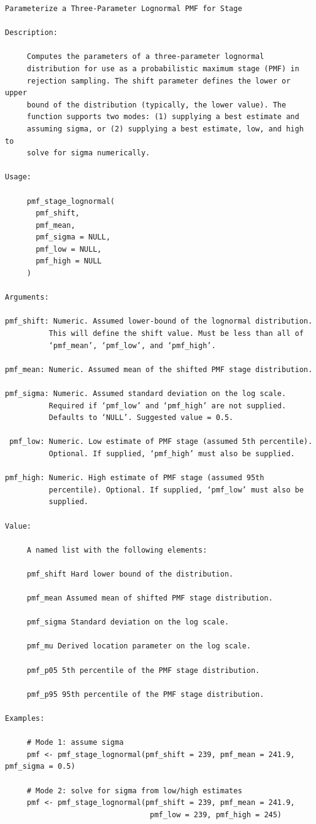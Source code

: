 \documentclass[
  letterpaper,
  DIV=11,
  numbers=noendperiod]{scrreprt}
\begin{document}
\begin{verbatim}
Parameterize a Three-Parameter Lognormal PMF for Stage

Description:

     Computes the parameters of a three-parameter lognormal
     distribution for use as a probabilistic maximum stage (PMF) in
     rejection sampling. The shift parameter defines the lower or upper
     bound of the distribution (typically, the lower value). The
     function supports two modes: (1) supplying a best estimate and
     assuming sigma, or (2) supplying a best estimate, low, and high to
     solve for sigma numerically.

Usage:

     pmf_stage_lognormal(
       pmf_shift,
       pmf_mean,
       pmf_sigma = NULL,
       pmf_low = NULL,
       pmf_high = NULL
     )
     
Arguments:

pmf_shift: Numeric. Assumed lower-bound of the lognormal distribution.
          This will define the shift value. Must be less than all of
          ‘pmf_mean’, ‘pmf_low’, and ‘pmf_high’.

pmf_mean: Numeric. Assumed mean of the shifted PMF stage distribution.

pmf_sigma: Numeric. Assumed standard deviation on the log scale.
          Required if ‘pmf_low’ and ‘pmf_high’ are not supplied.
          Defaults to ‘NULL’. Suggested value = 0.5.

 pmf_low: Numeric. Low estimate of PMF stage (assumed 5th percentile).
          Optional. If supplied, ‘pmf_high’ must also be supplied.

pmf_high: Numeric. High estimate of PMF stage (assumed 95th
          percentile). Optional. If supplied, ‘pmf_low’ must also be
          supplied.

Value:

     A named list with the following elements:

     pmf_shift Hard lower bound of the distribution.

     pmf_mean Assumed mean of shifted PMF stage distribution.

     pmf_sigma Standard deviation on the log scale.

     pmf_mu Derived location parameter on the log scale.

     pmf_p05 5th percentile of the PMF stage distribution.

     pmf_p95 95th percentile of the PMF stage distribution.

Examples:

     # Mode 1: assume sigma
     pmf <- pmf_stage_lognormal(pmf_shift = 239, pmf_mean = 241.9, pmf_sigma = 0.5)
     
     # Mode 2: solve for sigma from low/high estimates
     pmf <- pmf_stage_lognormal(pmf_shift = 239, pmf_mean = 241.9,
                                 pmf_low = 239, pmf_high = 245)
     
\end{verbatim}
\end{document}
